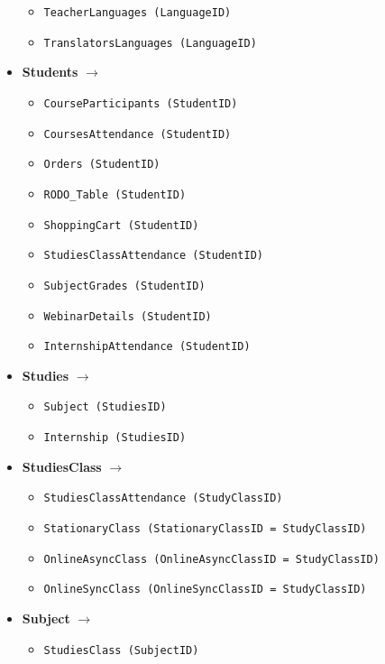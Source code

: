 \documentclass[12pt]{article}
\begin{document}
\begin{itemize}
\begin{itemize}
            \item \texttt{TeacherLanguages (LanguageID)}
            \item \texttt{TranslatorsLanguages (LanguageID)}
        \end{itemize}
    \item \textbf{Students} \(\rightarrow\)
        \begin{itemize}
            \item \texttt{CourseParticipants (StudentID)}
            \item \texttt{CoursesAttendance (StudentID)}
            \item \texttt{Orders (StudentID)}
            \item \texttt{RODO\_Table (StudentID)}
            \item \texttt{ShoppingCart (StudentID)}
            \item \texttt{StudiesClassAttendance (StudentID)}
            \item \texttt{SubjectGrades (StudentID)}
            \item \texttt{WebinarDetails (StudentID)}
            \item \texttt{InternshipAttendance (StudentID)}
        \end{itemize}
    \item \textbf{Studies} \(\rightarrow\)
        \begin{itemize}
            \item \texttt{Subject (StudiesID)}
            \item \texttt{Internship (StudiesID)}
        \end{itemize}
    \item \textbf{StudiesClass} \(\rightarrow\)
        \begin{itemize}
            \item \texttt{StudiesClassAttendance (StudyClassID)}
            \item \texttt{StationaryClass (StationaryClassID = StudyClassID)}
            \item \texttt{OnlineAsyncClass (OnlineAsyncClassID = StudyClassID)}
            \item \texttt{OnlineSyncClass (OnlineSyncClassID = StudyClassID)}
        \end{itemize}
    \item \textbf{Subject} \(\rightarrow\)
        \begin{itemize}
            \item \texttt{StudiesClass (SubjectID)}

\end{itemize}
\end{itemize}
\end{document}
